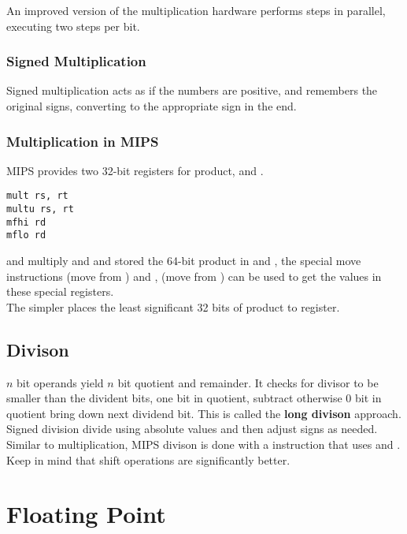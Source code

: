 \documentclass[11pt,a4paper,twocolumn]{book}
\begin{document}
An improved version of the multiplication hardware performs steps in parallel, executing two steps per bit.

\subsubsection{Signed Multiplication}

Signed multiplication acts as if the numbers are positive, and remembers the original signs, converting to the appropriate sign in the end.

\subsubsection{Multiplication in MIPS}

MIPS provides two 32-bit registers for product,  and .

\begin{lstlisting}
mult rs, rt
multu rs, rt
mfhi rd
mflo rd
\end{lstlisting}

 and  multiply  and  and stored the 64-bit product in  and , the special move instructions  (move from ) and , (move from ) can be used to get the values in these special registers.\\

The simpler  places the least significant 32 bits of product to  register.

\subsection{Divison}

$n$ bit operands yield $n$ bit quotient and remainder. It checks for divisor to be smaller than the divident bits, one bit in quotient, subtract otherwise 0 bit in quotient bring down next dividend bit. This is called the \textbf{long divison} approach.\\

Signed division divide using absolute values and then adjust signs as needed.\\

Similar to multiplication, MIPS divison is done with a  instruction that uses  and .\\

Keep in mind that shift operations are significantly better.

\section{Floating Point}
\end{document}
